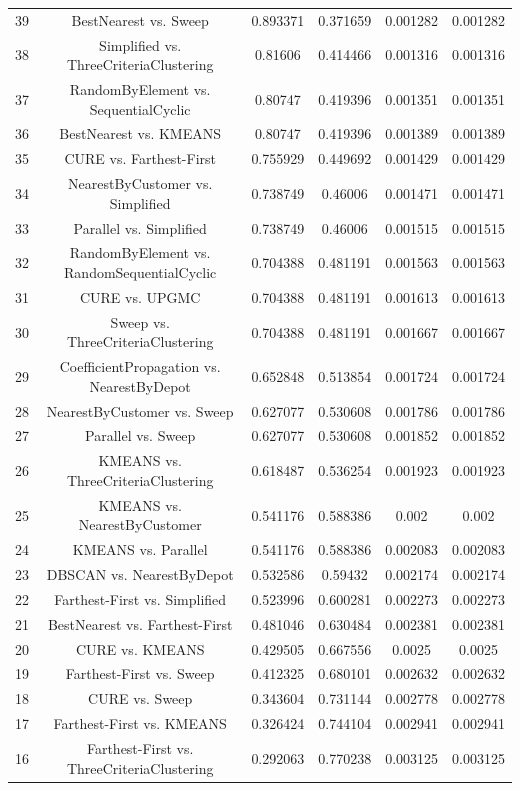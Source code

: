 \documentclass[a4paper,10pt]{article}
\begin{document}
\begin{landscape}
\begin{table}[!htp]
\begin{tabular}{cccccc}
39&BestNearest vs. Sweep&0.893371&0.371659&0.001282&0.001282\\
38&Simplified vs. ThreeCriteriaClustering&0.81606&0.414466&0.001316&0.001316\\
37&RandomByElement vs. SequentialCyclic&0.80747&0.419396&0.001351&0.001351\\
36&BestNearest vs. KMEANS&0.80747&0.419396&0.001389&0.001389\\
35&CURE vs. Farthest-First&0.755929&0.449692&0.001429&0.001429\\
34&NearestByCustomer vs. Simplified&0.738749&0.46006&0.001471&0.001471\\
33&Parallel vs. Simplified&0.738749&0.46006&0.001515&0.001515\\
32&RandomByElement vs. RandomSequentialCyclic&0.704388&0.481191&0.001563&0.001563\\
31&CURE vs. UPGMC&0.704388&0.481191&0.001613&0.001613\\
30&Sweep vs. ThreeCriteriaClustering&0.704388&0.481191&0.001667&0.001667\\
29&CoefficientPropagation vs. NearestByDepot&0.652848&0.513854&0.001724&0.001724\\
28&NearestByCustomer vs. Sweep&0.627077&0.530608&0.001786&0.001786\\
27&Parallel vs. Sweep&0.627077&0.530608&0.001852&0.001852\\
26&KMEANS vs. ThreeCriteriaClustering&0.618487&0.536254&0.001923&0.001923\\
25&KMEANS vs. NearestByCustomer&0.541176&0.588386&0.002&0.002\\
24&KMEANS vs. Parallel&0.541176&0.588386&0.002083&0.002083\\
23&DBSCAN vs. NearestByDepot&0.532586&0.59432&0.002174&0.002174\\
22&Farthest-First vs. Simplified&0.523996&0.600281&0.002273&0.002273\\
21&BestNearest vs. Farthest-First&0.481046&0.630484&0.002381&0.002381\\
20&CURE vs. KMEANS&0.429505&0.667556&0.0025&0.0025\\
19&Farthest-First vs. Sweep&0.412325&0.680101&0.002632&0.002632\\
18&CURE vs. Sweep&0.343604&0.731144&0.002778&0.002778\\
17&Farthest-First vs. KMEANS&0.326424&0.744104&0.002941&0.002941\\
16&Farthest-First vs. ThreeCriteriaClustering&0.292063&0.770238&0.003125&0.003125\\

\end{tabular}
\end{table}
\end{landscape}
\end{document}
